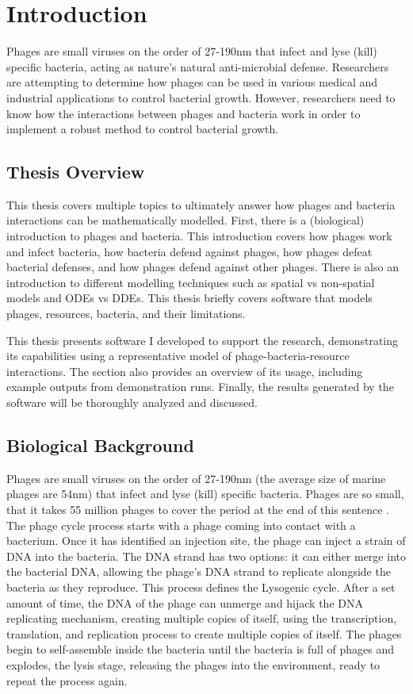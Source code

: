 \chapter{Introduction}
\label{Introduction}

Phages are small viruses on the order of 27-190nm that infect and lyse (kill) specific bacteria, acting as nature's natural anti-microbial defense. 
Researchers are attempting to determine how phages can be used in various medical and industrial applications to control bacterial growth. 
However, researchers need to know how the interactions between phages and bacteria work in order to implement a robust method to control bacterial growth. 

\section{Thesis Overview}
This thesis covers multiple topics to ultimately answer how phages and bacteria interactions can be mathematically modelled. 
First, there is a (biological) introduction to phages and bacteria. 
This introduction covers how phages work and infect bacteria, how bacteria defend against phages, how phages defeat bacterial defenses, and how phages defend against other phages. 
There is also an introduction to different modelling techniques such as spatial vs non-spatial models and ODEs vs DDEs. 
This thesis briefly covers software that models phages, resources, bacteria, and their limitations. 

This thesis presents software I developed to support the research, demonstrating its capabilities using a representative model of phage-bacteria-resource interactions. 
The section also provides an overview of its usage, including example outputs from demonstration runs.
Finally, the results generated by the software will be thoroughly analyzed and discussed.

\section{Biological Background}
Phages are small viruses on the order of 27-190nm (the average size of marine phages are 54nm) that infect and lyse (kill) specific bacteria.
Phages are so small, that it takes 55 million phages to cover the period at the end of this sentence \cite{breitbartPhagePuppetMasters2018}. 
The phage cycle process starts with a phage coming into contact with a bacterium.
Once it has identified an injection site, the phage can inject a strain of DNA into the bacteria.
The DNA strand has two options: it can either merge into the bacterial DNA, allowing the phage's DNA strand to replicate alongside the bacteria as they reproduce.
This process defines the Lysogenic cycle.
After a set amount of time, the DNA of the phage can unmerge and hijack the DNA replicating mechanism, creating multiple copies of itself, using the transcription, translation, and replication process to create multiple copies of itself.
The phages begin to self-assemble inside the bacteria until the bacteria is full of phages and explodes, the lysis stage, releasing the phages into the environment, ready to repeat the process again. 

